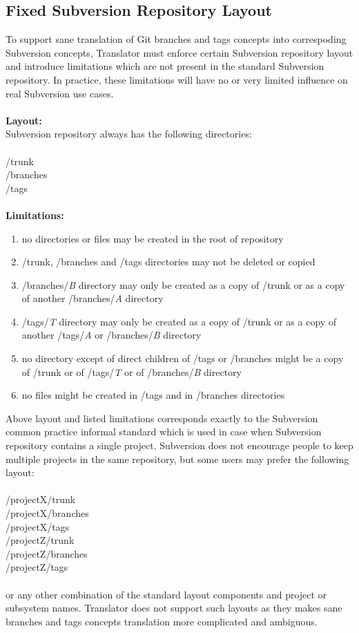 \subsection{Fixed Subversion Repository Layout}

To support sane translation of Git branches and tags concepts into correspoding Subversion concepts, Translator must enforce certain Subversion repository layout and introduce limitations which are not present in the standard Subversion repository. 
In practice, these limitations will have no or very limited influence on real Subversion use cases.
\\\\
\textbf{Layout:}\\ 
Subversion repository always has the following directories:
\\\\
/trunk\\
/branches\\
/tags\\\\
\textbf{Limitations:}
\begin{enumerate}
\item no directories or files may be created in the root of repository
\item /trunk, /branches and /tags directories may not be deleted or copied%
\item /branches/\emph{B} directory may only be created as a copy of /trunk or
as a copy of another /branches/\emph{A} directory%
\item /tags/\emph{T} directory may only be created as a copy of /trunk or
as a copy of another /tags/\emph{A} or /branches/\emph{B} directory
\item no directory except of direct children of /tags or /branches might be a
copy of /trunk or of /tags/\emph{T} or of /branches/\emph{B} directory
\item no files might be created in /tags and in /branches directories
\end{enumerate}
Above layout and listed limitations corresponds exactly to the Subversion common practice informal standard which
is used in case when Subversion repository contains a single project. Subversion does not encourage people 
to keep multiple projects in the same repository, but some users may prefer the following layout:
\\\\
/projectX/trunk\\
/projectX/branches\\
/projectX/tags\\
/projectZ/trunk\\
/projectZ/branches\\
/projectZ/tags\\\\
or any other combination of the standard layout components and project or subsystem names. Translator does not support such layouts as they 
makes sane branches and tags concepts translation more complicated and ambiguous.
